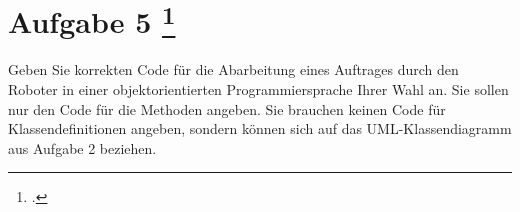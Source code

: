 \documentclass{lehramt-informatik-aufgabe}
\begin{document}
\section{Aufgabe 5
\footcite{examen:66116:2019:03}}

Geben Sie korrekten Code für die Abarbeitung eines Auftrages durch den
Roboter in einer objektorientierten Programmiersprache Ihrer Wahl an.
Sie sollen nur den Code für die Methoden angeben. Sie brauchen keinen
Code für Klassendefinitionen angeben, sondern können sich auf das
UML-Klassendiagramm aus Aufgabe 2 beziehen.

\end{document}
